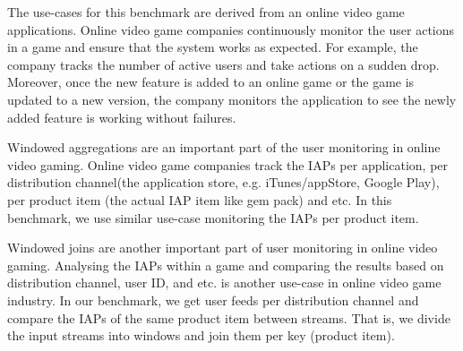 

%
%



The use-cases for this benchmark are derived from an online video game applications. Online video game companies continuously monitor the user actions in a game and ensure that the system works as expected. For example, the company tracks the number of active users and take actions on a sudden drop. Moreover, once the new feature is added to an online game or the game is updated to a new version, the company monitors the application to see  the newly added feature is working  without failures.

Windowed aggregations are an important part of the user monitoring in online video gaming. Online video game companies track the IAPs per application, per distribution channel(the application store, e.g. iTunes/appStore, Google Play), per product item (the actual IAP item like gem pack) and etc. In this benchmark, we use similar use-case monitoring the IAPs per product item. 

Windowed joins are another important part of user monitoring in online video gaming.  Analysing the IAPs within a game and comparing the results based on distribution channel, user ID, and etc. is another use-case in online video game industry. In our benchmark, we get user feeds per distribution channel and compare the IAPs of the same product item between streams. That is, we divide the input streams into windows and join them per key (product item). 



